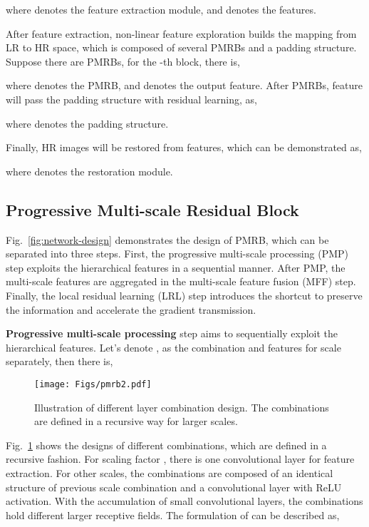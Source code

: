 \documentclass[journal]{IEEEtran}
\begin{document}
where  denotes the feature extraction module, and  denotes the features.

After feature extraction, non-linear feature exploration builds the mapping from LR to HR space, which is composed of several PMRBs and a padding structure. Suppose there are  PMRBs, for the -th block, there is,

where  denotes the PMRB, and  denotes the output feature. After PMRBs, feature will pass the padding structure with residual learning, as,

where  denotes the padding structure.

Finally, HR images will be restored from features, which can be demonstrated as,

where  denotes the restoration module.
	
\subsection{Progressive Multi-scale Residual Block}
Fig.~\ref{fig:network-design} demonstrates the design of PMRB, which can be separated into three steps. First, the progressive multi-scale processing (PMP) step exploits the hierarchical features in a sequential manner. After PMP, the multi-scale features are aggregated in the multi-scale feature fusion (MFF) step. Finally, the local residual learning (LRL) step introduces the shortcut to preserve the information and accelerate the gradient transmission.

\textbf{Progressive multi-scale processing} step aims to sequentially exploit the hierarchical features.
Let's denote ,  as the combination and features for scale  separately, then there is,


\begin{figure}
	\centering
	\texttt{[image: Figs/pmrb2.pdf]}
	\caption{Illustration of different layer combination design. The combinations are defined in a recursive way for larger scales.}
	\label{fig:pmrb}
\end{figure}

Fig.~\ref{fig:pmrb} shows the designs of different combinations, which are defined in a recursive fashion. For scaling factor , there is one convolutional layer for feature extraction. For other scales, the combinations are composed of an identical structure of previous scale combination and a convolutional layer with ReLU activation. With the accumulation of small convolutional layers, the combinations hold different larger receptive fields. The formulation of  can be described as,
\end{document}
